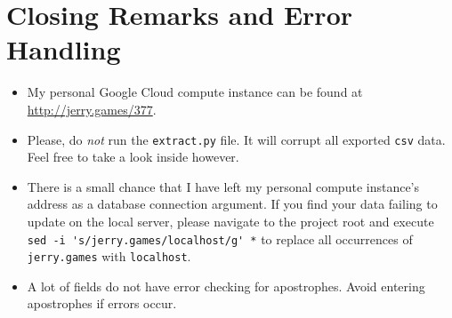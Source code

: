 \documentclass{paper}
\begin{document}
	\section{Closing Remarks and Error Handling}
	\begin{itemize}
		\item My personal Google Cloud compute instance can be found at \url{http://jerry.games/377}.
		\item Please, do \emph{not} run the \verb|extract.py| file. It will corrupt all exported \verb|csv| data. Feel free to take a look inside however.
		\item There is a small chance that I have left my personal compute instance's address as a database connection argument. If you find your data failing to update on the local server, please navigate to the project root and execute \verb|sed -i 's/jerry.games/localhost/g' *| to replace all occurrences of \verb|jerry.games| with \verb|localhost|.
		\item A lot of fields do not have error checking for apostrophes. Avoid entering apostrophes if errors occur.
	\end{itemize}
	
	\clearpage
	
\end{document}

